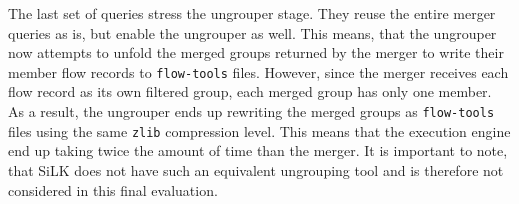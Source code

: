 The last set of queries stress the ungrouper stage. They reuse the entire
merger queries as is, but enable the ungrouper as well. This means, that the
ungrouper now attempts to unfold the merged groups returned by the merger to
write their member flow records to \texttt{flow-tools} files.  However, since
the merger receives each flow record as its own filtered group, each merged
group has only one member. As a result, the ungrouper ends up rewriting the
merged groups as \texttt{flow-tools} files using the same \texttt{zlib}
compression level. This means that the execution engine end up taking twice
the amount of time than the merger. It is important to note, that SiLK does
not have such an equivalent ungrouping tool and is therefore not considered in
this final evaluation.
